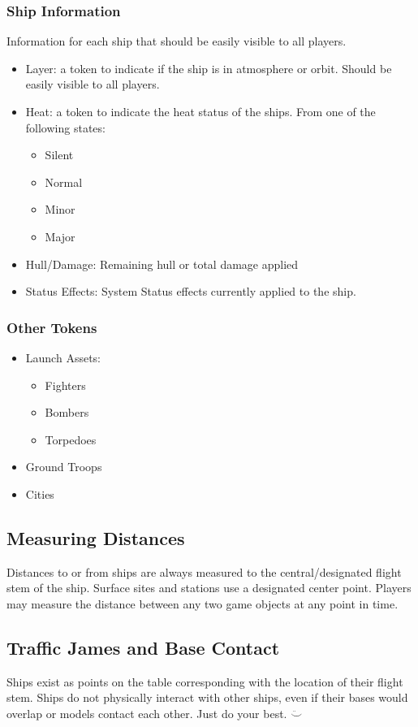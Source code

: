 \subsubsection{Ship Information}
Information for each ship that should be easily visible to all players.
\begin{itemize}
	\item Layer: a token to indicate if the ship is in atmosphere or orbit. Should be easily visible to all players.
	\item Heat: a token to indicate the heat status of the ships. From one of the following states:
	\begin{itemize}
		\item Silent
		\item Normal
		\item Minor
		\item Major
	\end{itemize}
	\item Hull/Damage: Remaining hull or total damage applied
	\item Status Effects: System Status effects currently applied to the ship.
\end{itemize}

\subsubsection{Other Tokens}
\begin{itemize}
	\item Launch Assets:
	\begin{itemize}
		\item Fighters
		\item Bombers
		\item Torpedoes
	\end{itemize}
	\item Ground Troops
	\item Cities
\end{itemize}

\subsection{Measuring Distances}
Distances to or from ships are always measured to the central/designated flight stem of the ship. Surface sites and stations use a designated center point. Players may measure the distance between any two game objects at any point in time.

\subsection{Traffic James and Base Contact}
Ships exist as points on the table corresponding with the location of their flight stem. Ships do not physically interact with other ships, even if their bases would overlap or models contact each other. Just do your best. $\ddot\smile$